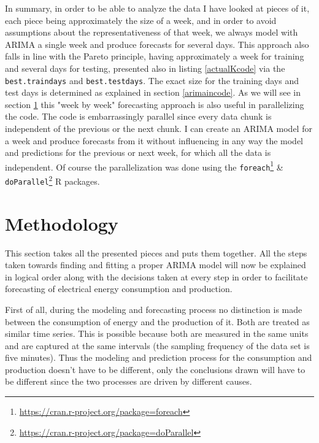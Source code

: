 \documentclass[12pt,a4paper,titlepage]{report}
\begin{document}
In summary, in order to be able to analyze the data I have looked at pieces of it, each piece being approximately the size of a week, and in order to avoid assumptions about the representativeness of that week, we always model with ARIMA a single week and produce forecasts for several days. This approach also falls in line with the Pareto principle, having approximately a week for training and several days for testing, presented also in listing \ref{actualKcode} via the \texttt{best.traindays} and \texttt{best.testdays}. The exact size for the training days and test days is determined as explained in section \ref{arimaincode}. As we will see in section \ref{methodologysection} this "week by week" forecasting approach is also useful in parallelizing the code. The code is embarrassingly parallel since every data chunk is independent of the previous or the next chunk. I can create an ARIMA model for a week and produce forecasts from it without influencing in any way the model and predictions for the previous or next week, for which all the data is independent. Of course the parallelization was done using the \texttt{foreach}\footnote{\url{https://cran.r-project.org/package=foreach}} \& \texttt{doParallel}\footnote{\url{https://cran.r-project.org/package=doParallel}} R packages.

\section{Methodology} \label{methodologysection}
This section takes all the presented pieces and puts them together. All the steps taken towards finding and fitting a proper ARIMA model will now be explained in logical order along with the decisions taken at every step in order to facilitate forecasting of electrical energy consumption and production.

First of all, during the modeling and forecasting process no distinction is made between the consumption of energy and the production of it. Both are treated as similar time series. This is possible because both are measured in the same units and are captured at the same intervals (the sampling frequency of the data set is five minutes). Thus the modeling and prediction process for the consumption and production doesn't have to be different, only the conclusions drawn will have to be different since the two processes are driven by different causes.
\end{document}

